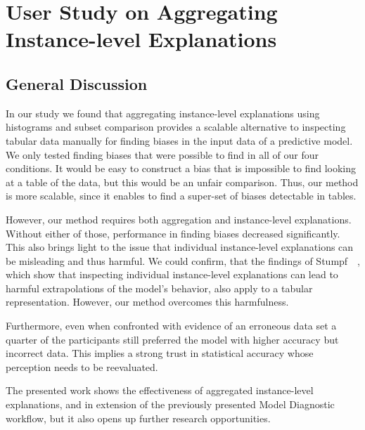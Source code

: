 \chapter{User Study on Aggregating Instance-level Explanations}
\label{chap:aggexplain}


\section{General Discussion}
In our study we found that aggregating instance-level explanations using histograms and subset comparison provides a scalable alternative to inspecting tabular data manually for finding biases in the input data of a predictive model.
We only tested finding biases that were possible to find in all of our four conditions.
It would be easy to construct a bias that is impossible to find looking at a table of the data, but this would be an unfair comparison.
Thus, our method is more scalable, since it enables to find a super-set of biases detectable in tables.

However, our method requires both aggregation and instance-level explanations.
Without either of those, performance in finding biases decreased significantly.
This also brings light to the issue that individual instance-level explanations can be misleading and thus harmful.
We could confirm, that the findings of Stumpf~\etal~\cite{harmful}, which show that inspecting individual instance-level explanations can lead to harmful extrapolations of the model's behavior, also apply to a tabular representation.
However, our method overcomes this harmfulness.

Furthermore, even when confronted with evidence of an erroneous data set a quarter of the participants still preferred the model with higher accuracy but incorrect data.
This implies a strong trust in statistical accuracy whose perception needs to be reevaluated.

The presented work shows the effectiveness of aggregated instance-level explanations, and in extension of the previously presented Model Diagnostic workflow, but it also opens up further research opportunities.
